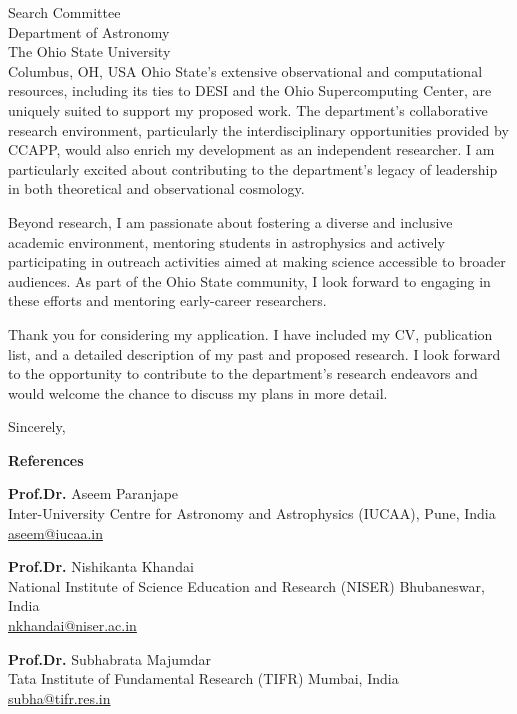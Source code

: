 \documentclass[11pt]{letter}
\begin{document}
\begin{letter}{Search Committee \\ Department of Astronomy \\ The Ohio State University \\ Columbus, OH, USA}
Ohio State's extensive observational and computational resources, including its ties to DESI and the Ohio Supercomputing Center, are uniquely suited to support my proposed work. The department's collaborative research environment, particularly the interdisciplinary opportunities provided by CCAPP, would also enrich my development as an independent researcher. I am particularly excited about contributing to the department's legacy of leadership in both theoretical and observational cosmology.

Beyond research, I am passionate about fostering a diverse and inclusive academic environment, mentoring students in astrophysics and actively participating in outreach activities aimed at making science accessible to broader audiences. As part of the Ohio State community, I look forward to engaging in these efforts and mentoring early-career researchers.

Thank you for considering my application. I have included my CV, publication list, and a detailed description of my past and proposed research. I look forward to the opportunity to contribute to the department's research endeavors and would welcome the chance to discuss my plans in more detail.

\closing{Sincerely,}

\end{letter}


\textbf{\Huge{References}}


{\textbf{  Prof.Dr.} Aseem Paranjape\\} %
{Inter-University Centre for Astronomy and Astrophysics (IUCAA),} %
{Pune, India\\} %
{\href{mailto:aseem@iucaa.in}{aseem@iucaa.in}} %
{}





{\textbf{  Prof.Dr.} Nishikanta Khandai\\} %
{National Institute of Science Education and Research (NISER)} %
{Bhubaneswar, India\\} %
{\href{mailto:nkhandai@niser.ac.in}{nkhandai@niser.ac.in}} %
{}




{\textbf{  Prof.Dr.} Subhabrata Majumdar\\} %
{Tata Institute of Fundamental Research (TIFR)} %
{Mumbai, India\\} %
{\href{mailto:subha@tifr.res.in}{subha@tifr.res.in}} %
{}
\end{document}
